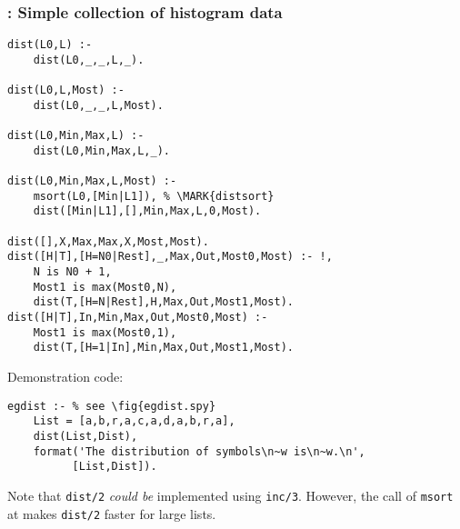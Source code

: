 \subsubsection{ : Simple collection of histogram data 
}
\label{sec:dist/2}
\begin{Verbatim}
dist(L0,L) :- 
    dist(L0,_,_,L,_).

dist(L0,L,Most) :- 
    dist(L0,_,_,L,Most).

dist(L0,Min,Max,L) :-
    dist(L0,Min,Max,L,_).

dist(L0,Min,Max,L,Most) :-
    msort(L0,[Min|L1]), % \MARK{distsort}
    dist([Min|L1],[],Min,Max,L,0,Most).

dist([],X,Max,Max,X,Most,Most).
dist([H|T],[H=N0|Rest],_,Max,Out,Most0,Most) :- !,
    N is N0 + 1,
    Most1 is max(Most0,N),
    dist(T,[H=N|Rest],H,Max,Out,Most1,Most).
dist([H|T],In,Min,Max,Out,Most0,Most) :-
    Most1 is max(Most0,1),
    dist(T,[H=1|In],Min,Max,Out,Most1,Most).
\end{Verbatim}
 Demonstration code: 
\begin{Verbatim}
egdist :- % see \fig{egdist.spy}
    List = [a,b,r,a,c,a,d,a,b,r,a],
    dist(List,Dist),
    format('The distribution of symbols\n~w is\n~w.\n',
          [List,Dist]).
\end{Verbatim}
Note that {\tt dist/2} {\em could be} implemented
using {\tt inc/3}. However, the call of {\tt msort} at 
makes  {\tt dist/2} faster for large lists.
